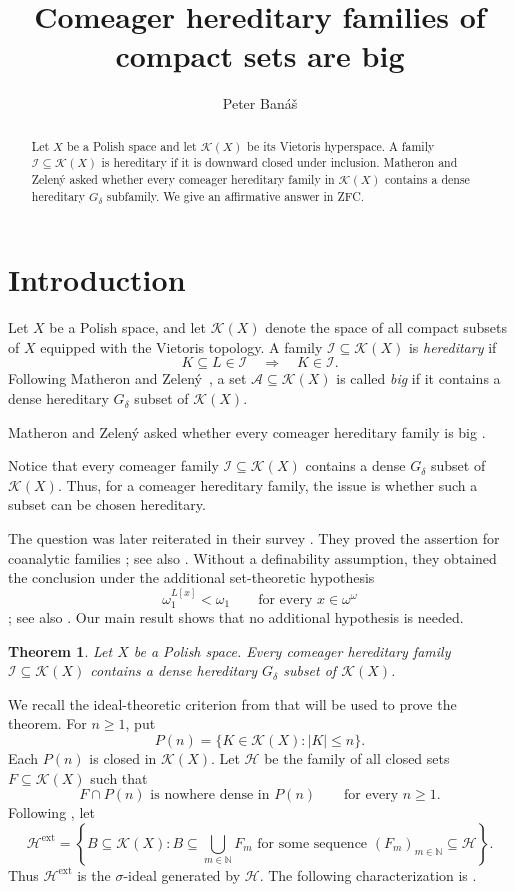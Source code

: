 \documentclass[11pt]{amsart}
\title[Comeager hereditary families]{Comeager hereditary families of compact sets are big}
\author{Peter Banáš}
\newtheorem{theorem}{Theorem}[section]
\theoremstyle{remark}
\newcommand{\K}{\mathcal K}
\newcommand{\HH}{\mathcal H}
\newcommand{\I}{\mathcal I}
\begin{document}
\begin{abstract}
Let $X$ be a Polish space and let $\K(X)$ be its Vietoris hyperspace.
A family $\I\subseteq\K(X)$ is hereditary if it is downward closed under
inclusion. Matheron and Zelený asked whether every comeager hereditary
family in $\K(X)$ contains a dense hereditary $G_\delta$ subfamily.
We give an affirmative answer in ZFC.
\end{abstract}

\maketitle

\section{Introduction}

Let $X$ be a Polish space, and let $\K(X)$ denote the space of all compact
subsets of $X$ equipped with the Vietoris topology.
A family $\I\subseteq\K(X)$ is \emph{hereditary} if
\[
K\subseteq L\in\I \quad\Longrightarrow\quad K\in\I.
\]
Following Matheron and Zelený~\cite{MZ05}, a set
$\mathcal A\subseteq\K(X)$ is called \emph{big} if it contains a dense
hereditary $G_\delta$ subset of $\K(X)$.


Matheron and Zelený asked whether every comeager hereditary family is big
\cite[Problem~2.1]{MZ05}. 

Notice that every comeager family $\I \subseteq\K(X)$ contains a dense $G_\delta$ subset of $\K(X)$. Thus, for a comeager hereditary family, the issue is whether such a subset can be chosen hereditary.

The question was later reiterated in their survey
\cite[Problem~6.9]{MZ07}. They proved the assertion for coanalytic families
\cite[Theorem~2.2]{MZ05}; see also \cite[Theorem~5.11]{MZ07}. Without a
definability assumption, they obtained the conclusion under the additional
set-theoretic hypothesis
\[
\omega_1^{L[x]}<\omega_1
\qquad\text{for every }x\in\omega^\omega
\]
\cite[Theorem~2.9]{MZ05}; see also \cite[Remark~5.12]{MZ07}.
Our main result shows that no additional hypothesis is needed.

\begin{theorem}\label{thm:main}
Let $X$ be a Polish space. Every comeager hereditary family
$\I\subseteq\K(X)$ contains a dense hereditary
$G_\delta$ subset of $\K(X)$.
\end{theorem}

We recall the ideal-theoretic criterion from \cite{MZ05} that will be used to
prove the theorem. For $n\geq1$, put
\[
P(n)=\{K\in\K(X):|K|\leq n\}.
\]
Each $P(n)$ is closed in $\K(X)$. Let $\HH$ be the family of all closed
sets $F\subseteq\K(X)$ such that
\[
F\cap P(n)\text{ is nowhere dense in }P(n)
\qquad\text{for every }n\geq1.
\]
Following \cite[Definition~2.3]{MZ05}, let
\[
\HH^{\mathrm{ext}}
=
\left\{
B\subseteq\K(X):
B\subseteq\bigcup_{m\in\mathbb N}F_m
\text{ for some sequence }(F_m)_{m\in\mathbb N}\subseteq\HH
\right\}.
\]
Thus $\HH^{\mathrm{ext}}$ is the $\sigma$-ideal generated by $\HH$.
The following characterization is \cite[Corollary~2.5]{MZ05}.
\end{document}
